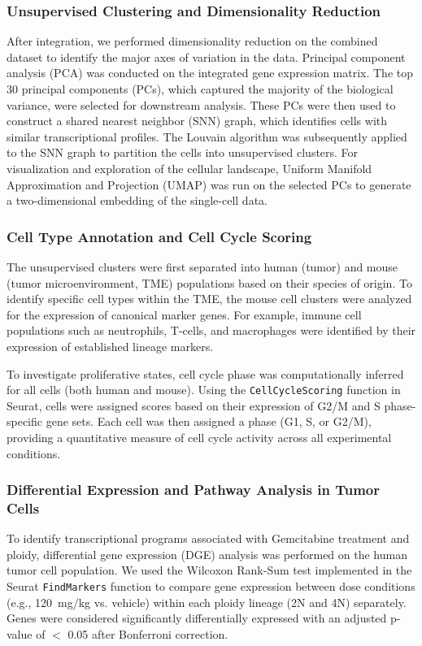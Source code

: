 \documentclass{article}
\begin{document}
\subsubsection{Unsupervised Clustering and Dimensionality Reduction}
After integration, we performed dimensionality reduction on the combined dataset to identify the major axes of variation in the data. Principal component analysis (PCA) was conducted on the integrated gene expression matrix. The top 30 principal components (PCs), which captured the majority of the biological variance, were selected for downstream analysis. These PCs were then used to construct a shared nearest neighbor (SNN) graph, which identifies cells with similar transcriptional profiles. The Louvain algorithm was subsequently applied to the SNN graph to partition the cells into unsupervised clusters. For visualization and exploration of the cellular landscape, Uniform Manifold Approximation and Projection (UMAP) was run on the selected PCs to generate a two-dimensional embedding of the single-cell data.

\subsubsection{Cell Type Annotation and Cell Cycle Scoring}
The unsupervised clusters were first separated into human (tumor) and mouse (tumor microenvironment, TME) populations based on their species of origin. To identify specific cell types within the TME, the mouse cell clusters were analyzed for the expression of canonical marker genes. For example, immune cell populations such as neutrophils, T-cells, and macrophages were identified by their expression of established lineage markers.

To investigate proliferative states, cell cycle phase was computationally inferred for all cells (both human and mouse). Using the \texttt{CellCycleScoring} function in Seurat, cells were assigned scores based on their expression of G2/M and S phase-specific gene sets. Each cell was then assigned a phase (G1, S, or G2/M), providing a quantitative measure of cell cycle activity across all experimental conditions.


\subsubsection{Differential Expression and Pathway Analysis in Tumor Cells}
To identify transcriptional programs associated with Gemcitabine treatment and ploidy, differential gene expression (DGE) analysis was performed on the human tumor cell population. We used the Wilcoxon Rank-Sum test implemented in the Seurat \texttt{FindMarkers} function to compare gene expression between dose conditions (e.g., 120~mg/kg vs. vehicle) within each ploidy lineage (2N and 4N) separately. Genes were considered significantly differentially expressed with an adjusted p-value of $<$ 0.05 after Bonferroni correction.
\end{document}
